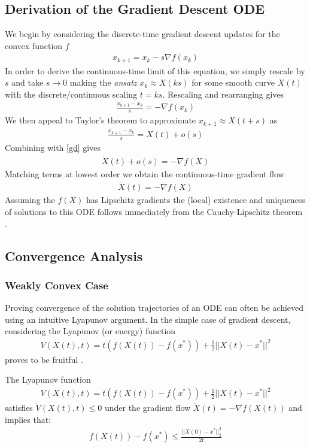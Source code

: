 \subsection{Derivation of the Gradient Descent ODE}
We begin by considering the discrete-time gradient descent updates for the convex function $f$
\begin{align*}
    x_{k+1} = x_k - s \nabla f(x_k) 
\end{align*}
In order to derive the continuous-time limit of this equation, we simply rescale by $s$ and take $s \to 0$ making the \textit{ansatz} $x_k \approx X(ks)$ for some smooth curve $X(t)$ with the discrete/continuous scaling $t=ks$. Rescaling and rearranging gives
\begin{align}
    \frac{x_{k+1} - x_k}{s} = - \nabla f(x_k) \label{gd}
\end{align}
We then appeal to Taylor's theorem to approximate $x_{k+1} \approx X(t+s)$ as
\begin{align*}
    \frac{x_{k+1} - x_k}{s} = \dot{X}(t) + o(s)
\end{align*}
Combining with \eqref{gd} gives
\begin{align*}
    \dot{X}(t) + o(s) = - \nabla f(X)
\end{align*}
Matching terms at lowest order we obtain the continuous-time gradient flow
\begin{align}
    \dot{X}(t) = -\nabla f(X) \label{gdode}
\end{align}
Assuming the $f(X)$ has Lipschitz gradients the (local) existence and uniqueness of solutions to this ODE follows immediately from the Cauchy-Lipschitz theorem \citep{teschl2012ordinary}.
\subsection{Convergence Analysis}
\subsubsection{Weakly Convex Case}
Proving convergence of the solution trajectories of an ODE can often be achieved using an intuitive Lyapunov argument. In the simple case of gradient descent, considering the Lyapunov (or energy) function
\begin{align}
\label{gdlyap}
    V(X(t), t) = t (f(X(t)) - f(x^*)) + \frac{1}{2}||X(t)-x^*||^2
\end{align}
proves to be fruitful \citep{su2014differential}.

\begin{theorem}
The Lyapunov function
\begin{align*}
    V(X(t), t) = t (f(X(t)) - f(x^*)) + \frac{1}{2}||X(t)-x^*||^2
\end{align*}
satisfies $\dot{V}(X(t), t) \leq 0$ under the gradient flow $\dot{X}(t) = -\nabla f(X(t))$ and implies that:
\begin{align*}
    f(X(t)) - f(x^*) \leq \frac{||X(0)-x^*||_2^2}{2t}
\end{align*}
\end{theorem}

